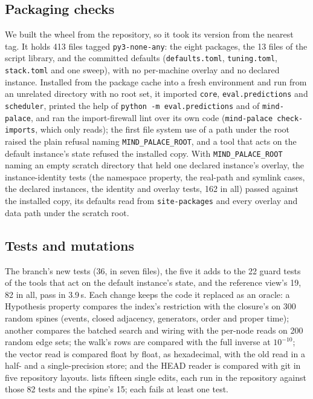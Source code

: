 \documentclass[11pt]{article}
\theoremstyle{plain}
\theoremstyle{definition}
\theoremstyle{remark}
\newcommand{\envroot}{\texttt{MIND\_PALACE\_ROOT}}
\begin{document}
\subsection{Packaging checks}
We built the wheel from the repository, so it took its version from the nearest tag. It holds 413
files tagged \texttt{py3-none-any}: the eight packages, the 13 files of the script library, and the
committed defaults (\texttt{defaults.toml}, \texttt{tuning.toml}, \texttt{stack.toml} and one
sweep), with no per-machine overlay and no declared instance. Installed from the package cache into
a fresh environment and run from an unrelated directory with no root set, it imported
\texttt{core}, \texttt{eval.predictions} and \texttt{scheduler}, printed the help of \texttt{python
-m eval.predictions} and of \texttt{mind-palace}, and ran the import-firewall lint over its own code
(\texttt{mind-palace check-imports}, which only reads); the first file system use of a path under
the root raised the plain refusal naming \envroot, and a tool that acts on the default instance's
state refused the installed copy. With \envroot{} naming an empty scratch directory that held one
declared instance's overlay, the instance-identity tests (the namespace property, the real-path and
symlink cases, the declared instances, the identity and overlay tests, 162 in all) passed against the
installed copy, its defaults read from \texttt{site-packages} and every overlay and data path under
the scratch root.

\subsection{Tests and mutations}\label{sec:tests}
The branch's new tests (36, in seven files), the five it adds to the 22 guard tests of the tools that
act on the default instance's state, and the reference view's 19, 82 in all, pass in 3.9\,s. Each change
keeps the code it replaced as an oracle: a Hypothesis property compares the index's restriction
with the closure's on 300 random spines (events, closed adjacency, generators, order and proper
time); another compares the batched search and wiring with the per-node reads on 200 random edge
sets; the walk's rows are compared with the full inverse at $10^{-10}$; the vector read is
compared float by float, as hexadecimal, with the old read in a half- and a single-precision store;
and the HEAD reader is compared with git in five repository layouts.  lists
fifteen single edits, each run in the repository against those 82 tests and the spine's 15; each
fails at least one test.
\end{document}
